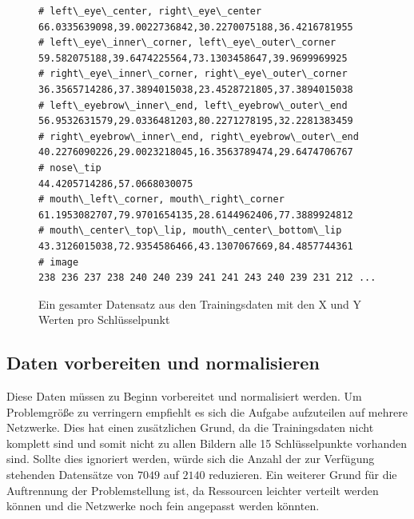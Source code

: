 \begin{figure}[ht!]
\lstset{language=Python}
	\begin{lstlisting}
# left\_eye\_center, right\_eye\_center
66.0335639098,39.0022736842,30.2270075188,36.4216781955
# left\_eye\_inner\_corner, left\_eye\_outer\_corner
59.582075188,39.6474225564,73.1303458647,39.9699969925
# right\_eye\_inner\_corner, right\_eye\_outer\_corner
36.3565714286,37.3894015038,23.4528721805,37.3894015038
# left\_eyebrow\_inner\_end, left\_eyebrow\_outer\_end
56.9532631579,29.0336481203,80.2271278195,32.2281383459
# right\_eyebrow\_inner\_end, right\_eyebrow\_outer\_end
40.2276090226,29.0023218045,16.3563789474,29.6474706767
# nose\_tip
44.4205714286,57.0668030075
# mouth\_left\_corner, mouth\_right\_corner
61.1953082707,79.9701654135,28.6144962406,77.3889924812
# mouth\_center\_top\_lip, mouth\_center\_bottom\_lip
43.3126015038,72.9354586466,43.1307067669,84.4857744361
# image
238 236 237 238 240 240 239 241 241 243 240 239 231 212 ...
\end{lstlisting}
	\caption{Ein gesamter Datensatz aus den Trainingsdaten mit den X und Y Werten pro Schlüsselpunkt}
	\label{fig:ausgangsdatenRoh}
\end{figure}

\subsection{Daten vorbereiten und normalisieren}

Diese Daten müssen zu Beginn vorbereitet und normalisiert werden. 
Um Problemgröße zu verringern empfiehlt es sich die Aufgabe aufzuteilen auf mehrere Netzwerke. 
Dies hat einen zusätzlichen Grund, da die Trainingsdaten nicht komplett sind und somit nicht zu allen Bildern alle 15 Schlüsselpunkte vorhanden sind. 
Sollte dies ignoriert werden, würde sich die Anzahl der zur Verfügung stehenden Datensätze von $7049$ auf $2140$ reduzieren. 
Ein weiterer Grund für die Auftrennung der Problemstellung ist, da Ressourcen leichter verteilt werden können und die Netzwerke noch fein angepasst werden könnten. \newline

